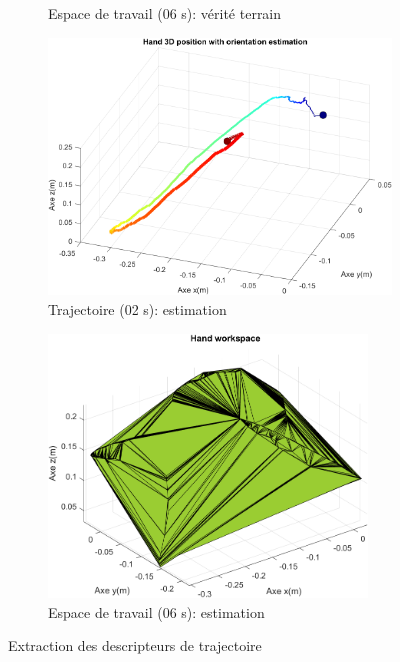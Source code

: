 \documentclass[8pt]{article}
\begin{document}
\begin{figure}[H]
\begin{subfigure}{0.5\textwidth}
        \caption{Espace de travail (06 s): vérité terrain}
        \label{subfig:workspace_ref}
    \end{subfigure}

    \begin{subfigure}{0.5\textwidth}
        \centering
        \includegraphics[width=\linewidth]{../results/mvt_1_3d_esmin.png}
        \caption{Trajectoire (02 s): estimation }
        \label{subfig:traj_es}
    \end{subfigure}
    \begin{subfigure}{0.5\textwidth}
        \centering
        \includegraphics[width=\linewidth, height=7cm]{../results/workspace_est_min.png}
        \caption{Espace de travail (06 s): estimation}
        \label{subfig:workspace_est}
    \end{subfigure}

    \caption{Extraction des descripteurs de trajectoire}
    \label{fig:hand_mvt}
\end{figure}
\end{document}
